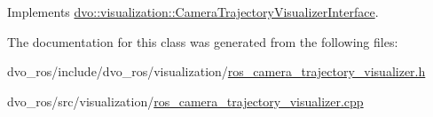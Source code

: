 Implements \mbox{\hyperlink{classdvo_1_1visualization_1_1_camera_trajectory_visualizer_interface_ac658e841335e51c50325267de10e64b3}{dvo\+::visualization\+::\+Camera\+Trajectory\+Visualizer\+Interface}}.



The documentation for this class was generated from the following files\+:\begin{DoxyCompactItemize}
\item 
dvo\+\_\+ros/include/dvo\+\_\+ros/visualization/\mbox{\hyperlink{ros__camera__trajectory__visualizer_8h}{ros\+\_\+camera\+\_\+trajectory\+\_\+visualizer.\+h}}\item 
dvo\+\_\+ros/src/visualization/\mbox{\hyperlink{ros__camera__trajectory__visualizer_8cpp}{ros\+\_\+camera\+\_\+trajectory\+\_\+visualizer.\+cpp}}\end{DoxyCompactItemize}

